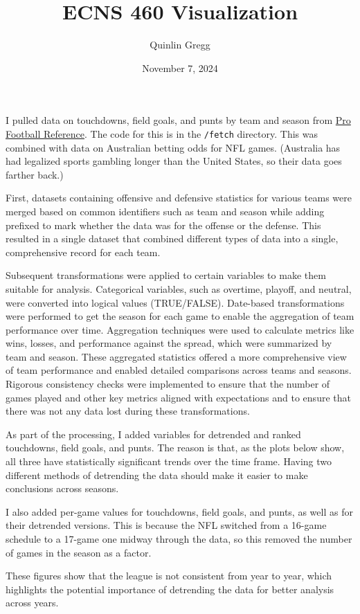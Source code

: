 \documentclass{article}
\title{ECNS 460 Visualization}
\author{Quinlin Gregg}
\date{November 7, 2024}
\begin{document}
\maketitle

I pulled data on touchdowns, field goals, and punts by team and season from
\href{https://www.pro-football-reference.com}{Pro Football Reference}. The code for this
is in the \texttt{/fetch} directory. This was combined with data on Australian betting odds
for NFL games. (Australia has had legalized sports gambling longer than the United States,
so their data goes farther back.)

First, datasets containing offensive and defensive statistics for various teams were merged based on common identifiers such as team and season while adding prefixed to mark whether the data was for the offense or the defense. This resulted in a single dataset that combined different types of data into a single, comprehensive record for each team.

Subsequent transformations were applied to certain variables to make them suitable for analysis. Categorical variables, such as overtime, playoff, and neutral, were converted into logical values (TRUE/FALSE). Date-based transformations were performed to get the season for each game to enable the aggregation of team performance over time. Aggregation techniques were used to calculate metrics like wins, losses, and performance against the spread, which were summarized by team and season. These aggregated statistics offered a more comprehensive view of team performance and enabled detailed comparisons across teams and seasons. Rigorous consistency checks were implemented to ensure that the number of games played and other key metrics aligned with expectations and to ensure that there was not any data lost during these transformations.

As part of the processing, I added variables for detrended and ranked touchdowns,
field goals, and punts. The reason is that, as the plots below show, all three have 
statistically significant trends over the time frame. Having two different methods of 
detrending the data should make it easier to make conclusions across seasons.

I also added per-game values for touchdowns, field goals, and punts, as well as for their
detrended versions. This is because the NFL switched from a 16-game schedule to a 17-game one 
midway through the data, so this removed the number of games in the season as a factor.

These figures show that the league is not consistent from year to year, which highlights the 
potential importance of detrending the data for better analysis across years.
\end{document}
